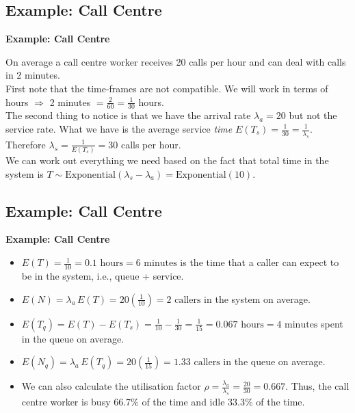 \documentclass[compress]{beamer}        %
\makeatletter
\newcommand{\tcb}{\textcolor{beamer@blendedblue}}
\makeatother
\begin{document}
\subsection{Example: Call Centre}
\begin{frame}{\bf \tcb{Example: Call Centre}}

On average a call centre worker receives 20 calls per hour and can deal with calls in 2 minutes.\\[0.6cm]

First note that the time-frames are not compatible. We will work in terms of hours $\Rightarrow$ 2 minutes $= \frac{2}{60} = \frac{1}{30}$ hours.\\[0.6cm]

The second thing to notice is that we have the arrival rate $\lambda_a = 20$ but not the service rate. What we have is the average service \emph{time} $E(T_s) = \frac{1}{30} = \frac{1}{\lambda_s}$. Therefore $\lambda_s = \frac{1}{E(T_s)} = 30$ calls per hour.\\[0.6cm]

We can work out everything we need based on the fact that total time in the system is $T \sim \text{Exponential}(\lambda_s-\lambda_a) = \text{Exponential}(10)$.


\end{frame}




\subsection{Example: Call Centre}
\begin{frame}{\bf \tcb{Example: Call Centre}}

\begin{itemize}\itemsep0.5cm
\item $E(T) = \frac{1}{10} = 0.1 \text{ hours} = 6 \text{ minutes}$ is the time that a caller can expect to be in the system, i.e., queue + service.
\item $E(N) = \lambda_a \, E(T) = 20(\tfrac{1}{10}) = 2 \text{ callers}$ in the system on average.
\item $E(T_q) = E(T) - E(T_s) = \tfrac{1}{10} - \tfrac{1}{30} = \tfrac{1}{15} =  0.067 \text{ hours} = 4 \text{ minutes}$ spent in the queue on average.
\item $E(N_q) = \lambda_a \, E(T_q) =  20 (\tfrac{1}{15}) = 1.33 \text{ callers}$ in the queue on average.
\item We can also calculate the utilisation factor $\rho = \frac{\lambda_a}{\lambda_s} = \frac{20}{30} = 0.667$. Thus, the call centre worker is busy 66.7\% of the time and idle 33.3\% of the time.
\end{itemize}


\end{frame}
\end{document}

